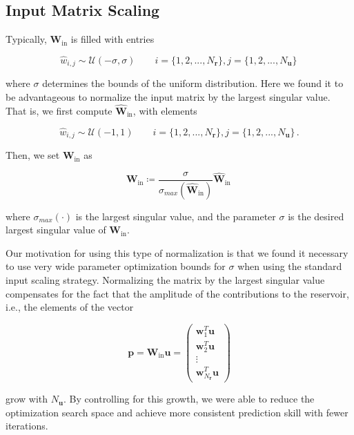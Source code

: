 \documentclass[draft]{agujournal2019}
\newcommand{\hidden}{\mathbf{r}}
\newcommand{\inputstate}{\mathbf{u}}
\newcommand{\inputmatrix}{\mathbf{W}_\text{in}}
\newcommand{\nhidden}{N_{\hidden}}
\newcommand{\ninputstate}{N_{\inputstate}}
\begin{document}
\subsection{Input Matrix Scaling}
\label{subsec:input-scaling}

Typically, $\inputmatrix$ is filled with entries
\begin{linenomath*}\begin{equation*}
    \hat{w}_{i,j} \sim \mathcal{U}(-\sigma,\sigma) \qquad
    i = \{1, 2, ..., \nhidden\}, j=\{1,2, ..., \ninputstate\} \,
\end{equation*}\end{linenomath*}
where $\sigma$ determines the bounds of the uniform
distribution.
Here we found it to be advantageous to normalize the input matrix by the
largest singular value.
That is, we first compute $\hat{\mathbf{W}}_\text{in}$, with elements
\begin{linenomath*}\begin{equation*}
    \hat{w}_{i,j} \sim \mathcal{U}(-1,1) \qquad
    i = \{1, 2, ..., \nhidden\}, j=\{1,2, ..., \ninputstate\} \, .
\end{equation*}\end{linenomath*}
Then, we set $\inputmatrix$ as
\begin{linenomath*}\begin{equation*}
    \inputmatrix \coloneqq
    \dfrac{\sigma}{\sigma_{max}\left(\hat{\mathbf{W}}_\text{in}\right)}
    \hat{\mathbf{W}}_\text{in} \,
\end{equation*}\end{linenomath*}
where $\sigma_{max}\left(\cdot\right)$ is the largest singular value, and
the parameter $\sigma$ is the desired largest singular value of
$\inputmatrix$.

Our motivation for using this type of normalization is that we found it
necessary to use very wide parameter optimization bounds for $\sigma$ when
using the standard input scaling strategy.
Normalizing the matrix by the largest singular value compensates for the fact that
the amplitude of the contributions to the reservoir, i.e., the elements of the
vector
\begin{linenomath*}\begin{equation*}
    \mathbf{p} = \inputmatrix \inputstate =
    \begin{pmatrix}
        \mathbf{w}_1^T\inputstate \\
        \mathbf{w}_2^T\inputstate \\
        \vdots \\
        \mathbf{w}_{\nhidden}^T\inputstate
    \end{pmatrix}
\end{equation*}\end{linenomath*}
grow with $\ninputstate$.
By controlling for this growth, we were able to reduce the optimization search
space and achieve more consistent prediction skill with fewer iterations.
\end{document}
